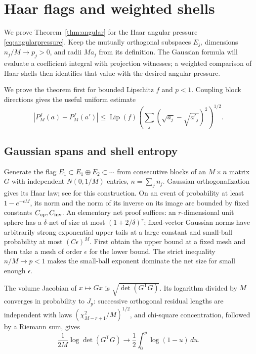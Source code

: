 \documentclass[11pt]{article}
\numberwithin{equation}{section}
\theoremstyle{definition}
\newcommand{\Lip}{\operatorname{Lip}}
\begin{document}
\section{Haar flags and weighted shells}
\label{sec:Haar}
We prove Theorem~\ref{thm:angular} for the Haar angular pressure \eqref{eq:angularpressure}. Keep the mutually orthogonal subspaces $E_j$, dimensions $n_j/M\to p_j>0$, and radii $Ma_j$ from its definition. The Gaussian formula will evaluate a coefficient integral with projection witnesses; a weighted comparison of Haar shells then identifies that value with the desired angular pressure.

We prove the theorem first for bounded Lipschitz $f$ and $p<1$. Coupling block directions gives the useful uniform estimate
\begin{equation}\label{eq:angularcontinuity}
|P_M^f(a)-P_M^f(a')|
\le\Lip(f)\left(\sum_j(\sqrt{a_j}-\sqrt{a'_j})^2\right)^{1/2}.
\end{equation}

\subsection{Gaussian spans and shell entropy}
Generate the flag $E_1\subset E_1\oplus E_2\subset\cdots$ from consecutive blocks of an $M\times n$ matrix $G$ with independent $N(0,1/M)$ entries, $n=\sum_jn_j$. Gaussian orthogonalization gives its Haar law; see \cite{Mezzadri2007} for this construction. On an event of probability at least $1-e^{-cM}$, its norm and the norm of its inverse on its image are bounded by fixed constants $C_{\rm op},C_{\rm inv}$. An elementary net proof suffices: an $r$-dimensional unit sphere has a $\delta$-net of size at most $(1+2/\delta)^r$; fixed-vector Gaussian norms have arbitrarily strong exponential upper tails at a large constant and small-ball probability at most $(C\epsilon)^M$. First obtain the upper bound at a fixed mesh and then take a mesh of order $\epsilon$ for the lower bound. The strict inequality $n/M\to p<1$ makes the small-ball exponent dominate the net size for small enough $\epsilon$.

The volume Jacobian of $x\mapsto Gx$ is $\sqrt{\det(G^{\mathsf T}G)}$. Its logarithm divided by $M$ converges in probability to $J_p$: successive orthogonal residual lengths are independent with laws $(\chi^2_{M-r+1}/M)^{1/2}$, and chi-square concentration, followed by a Riemann sum, gives
\begin{equation}\label{eq:Jacobian}
\frac1{2M}\log\det(G^{\mathsf T}G)\longrightarrow
\frac12\int_0^p\log(1-u)\,du.
\end{equation}
\end{document}
